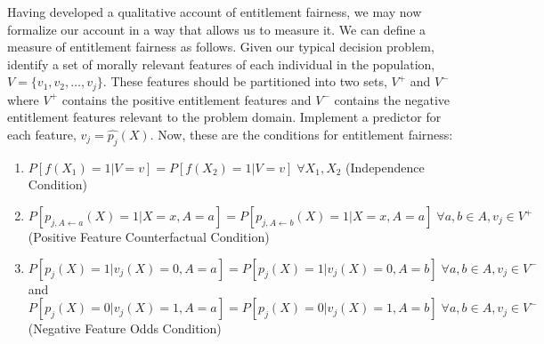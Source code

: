 Having developed a qualitative account of entitlement fairness, we may now
formalize our account in a way that allows us to measure it. We can
define a measure of entitlement fairness as follows. Given our typical decision
problem, identify a set of morally relevant features of each individual in the
population, $V = \{v_1, v_2, \ldots, v_j\}$. These features should be
partitioned into two sets, $V^+$ and $V^-$ where $V^+$ contains the positive
entitlement features and $V^-$ contains the negative entitlement features 
relevant to the problem domain. Implement a predictor for each feature,
$v_j = \hat{p_j}(X)$. Now, these are the conditions for entitlement fairness:
\begin{enumerate}
    \item $P[f(X_1) = 1 | V = v] = P[f(X_2) = 1 | V = v]\;\forall X_1, X_2$ (Independence Condition)
    \item $P[p_{j, A\leftarrow a}(X) = 1 | X=x, A=a] = P[p_{j, A\leftarrow b}(X) = 1 | X=x, A=a]\;\forall a, b \in A, v_j \in V^+$ (Positive Feature Counterfactual Condition)
    \item $P[p_j(X) = 1 | v_j(X) = 0, A = a] = P[p_j(X) = 1 | v_j(X) = 0, A = b]\;\forall a, b \in A, v_j \in V^-$ and 
    $P[p_j(X) = 0 | v_j(X) = 1, A = a] = P[p_j(X) = 0 | v_j(X) = 1, A = b]\;\forall a, b \in A, v_j \in V^-$ (Negative Feature Odds Condition)
\end{enumerate}

